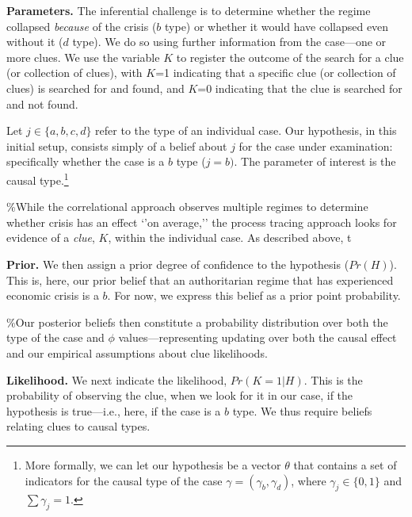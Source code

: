 \documentclass[12pt,]{book}
\let\rmarkdownfootnote\footnote%
\def\footnote{\protect\rmarkdownfootnote}
\begin{document}
\textbf{Parameters.} The inferential challenge is to determine whether the regime collapsed \emph{because} of the crisis (\(b\) type) or whether it would have collapsed even without it (\(d\) type). We do so using further information from the case---one or more clues. We use the variable \(K\) to register the outcome of the search for a clue (or collection of clues), with \(K\)=1 indicating that a specific clue (or collection of clues) is searched for and found, and \(K\)=0 indicating that the clue is searched for and not found.

Let \(j\in \{a,b,c,d\}\) refer to the type of an individual case. Our hypothesis, in this initial setup, consists simply of a belief about \(j\) for the case under examination: specifically whether the case is a \(b\) type (\(j=b)\). The parameter of interest is the causal type.\footnote{More formally, we can let our hypothesis be a vector \(\theta\) that contains a set of indicators for the causal type of the case \(\gamma=(\gamma_b, \gamma_d)\), where \(\gamma_j\in\{0,1\}\) and \(\sum \gamma_j = 1\).}

\%While the correlational approach observes multiple regimes to determine whether crisis has an effect `'on average,'' the process tracing approach looks for evidence of a \emph{clue}, \(K\), within the individual case. As described above, t

\textbf{Prior.} We then assign a prior degree of confidence to the hypothesis (\(Pr(H)\)). This is, here, our prior belief that an authoritarian regime that has experienced economic crisis is a \(b\). For now, we express this belief as a prior point probability.

\%Our posterior beliefs then constitute a probability distribution over both the type of the case and \(\phi\) values---representing updating over both the causal effect and our empirical assumptions about clue likelihoods.

\textbf{Likelihood.} We next indicate the likelihood, \(Pr(K=1|H)\). This is the probability of observing the clue, when we look for it in our case, if the hypothesis is true---i.e., here, if the case is a \(b\) type. We thus require beliefs relating clues to causal types.
\end{document}
